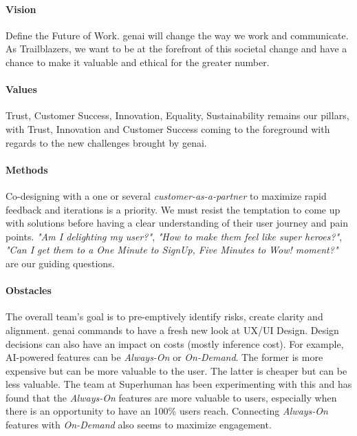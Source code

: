 \documentclass{tufte-handout}
\begin{document}
\paragraph{Vision}\label{sec:vision} Define the Future of Work. \gls{genai} will change the way we work and communicate. As Trailblazers, we want to be at the forefront of this societal change and have a chance to make it valuable and ethical for the greater number.

\paragraph{Values}\label{sec:values} Trust, Customer Success, Innovation, Equality, Sustainability remains our pillars, with Trust, Innovation and Customer Success coming to the foreground with regards to the new challenges brought by \gls{genai}.

\paragraph{Methods}\label{sec:methods} Co-designing with a one or several \textit{customer-as-a-partner} to maximize rapid feedback and iterations is a priority. We must resist the temptation to come up with solutions before having a clear understanding of their user journey and pain points. \emph{"Am I delighting my user?"}, \emph{"How to make them feel like super heroes?"}, \emph{"Can I get them to a One Minute to SignUp, Five Minutes to Wow! moment?"} are our guiding questions.\par


\paragraph{Obstacles}\label{sec:obstacles} The overall team's goal is to pre-emptively identify risks, create clarity and alignment. 
\gls{genai} commands to have a fresh new look at UX/UI Design. Design decisions can also have an impact on costs (mostly inference cost). For example, AI-powered features can be \emph{Always-On} or \emph{On-Demand}. The former is more expensive but can be more valuable to the user. The latter is cheaper but can be less valuable. The team at Superhuman has been experimenting with this and has found that the \emph{Always-On} features are more valuable to users, especially when there is an opportunity to have an 100\% users reach. Connecting \emph{Always-On} features with \emph{On-Demand} also seems to maximize engagement.\cite[-20pt]{rahulvohraEp30Superhuman2024}
\end{document}
